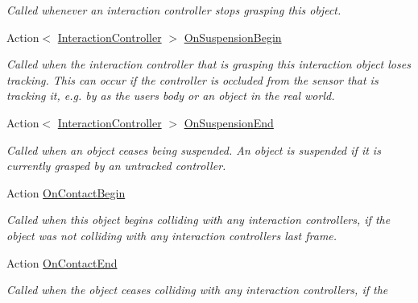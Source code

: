 \begin{DoxyCompactItemize}
\begin{DoxyCompactList}\small\item\em Called whenever an interaction controller stops grasping this object. \end{DoxyCompactList}\item 
Action$<$ \mbox{\hyperlink{class_leap_1_1_unity_1_1_interaction_1_1_interaction_controller}{Interaction\+Controller}} $>$ \mbox{\hyperlink{class_leap_1_1_unity_1_1_interaction_1_1_interaction_behaviour_a0aafa1ff61acea921ddb1eb002f4be89}{On\+Suspension\+Begin}}
\begin{DoxyCompactList}\small\item\em Called when the interaction controller that is grasping this interaction object loses tracking. This can occur if the controller is occluded from the sensor that is tracking it, e.\+g. by as the user\textquotesingle{}s body or an object in the real world. \end{DoxyCompactList}\item 
Action$<$ \mbox{\hyperlink{class_leap_1_1_unity_1_1_interaction_1_1_interaction_controller}{Interaction\+Controller}} $>$ \mbox{\hyperlink{class_leap_1_1_unity_1_1_interaction_1_1_interaction_behaviour_a3d34025a6b0a6f5c4160b2819aedae2d}{On\+Suspension\+End}}
\begin{DoxyCompactList}\small\item\em Called when an object ceases being suspended. An object is suspended if it is currently grasped by an untracked controller. \end{DoxyCompactList}\item 
Action \mbox{\hyperlink{class_leap_1_1_unity_1_1_interaction_1_1_interaction_behaviour_ab577334d9537036c90b20660e434b2d0}{On\+Contact\+Begin}}
\begin{DoxyCompactList}\small\item\em Called when this object begins colliding with any interaction controllers, if the object was not colliding with any interaction controllers last frame. \end{DoxyCompactList}\item 
Action \mbox{\hyperlink{class_leap_1_1_unity_1_1_interaction_1_1_interaction_behaviour_a837845efd5d6e112b526078a4ae5f1fc}{On\+Contact\+End}}
\begin{DoxyCompactList}\small\item\em Called when the object ceases colliding with any interaction controllers, if the \end{DoxyCompactList}\item 

\end{DoxyCompactItemize}
